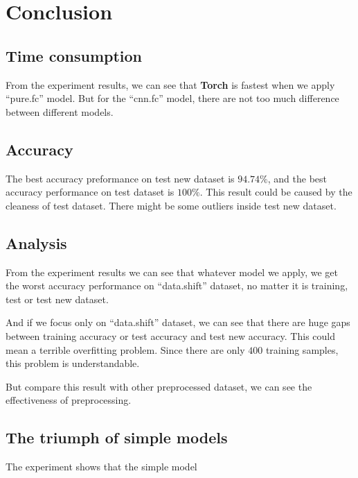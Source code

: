 \documentclass[a4paper]{article}
\begin{document}
\section{Conclusion}

\subsection{Time consumption}

From the experiment results, we can see that \textbf{Torch} is fastest when we apply ``pure.fc'' model. But for the ``cnn.fc'' model, there are not too much difference between different models.

\subsection{Accuracy}

The best accuracy preformance on test new dataset is $94.74\%$, and the best accuracy performance on test dataset is $100\%$. This result could be caused by the cleaness of test dataset. There might be some outliers inside test new dataset.

\subsection{Analysis}

From the experiment results we can see that whatever model we apply, we get the worst accuracy performance on ``data.shift'' dataset, no matter it is training, test or test new dataset.

And if we focus only on ``data.shift'' dataset, we can see that there are huge gaps between training accuracy or test accuracy and test new accuracy. This could mean a terrible overfitting problem. Since there are only $400$ training samples, this problem is understandable.

But compare this result with other preprocessed dataset, we can see the effectiveness of preprocessing.

\subsection{The triumph of simple models}
The experiment shows that the simple model


%
% 
%
\end{document}
